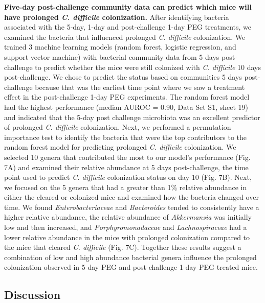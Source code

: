 \documentclass[
  11pt,
]{article}
\begin{document}
\textbf{Five-day post-challenge community data can predict which mice
will have prolonged \emph{C. difficile} colonization.} After identifying
bacteria associated with the 5-day, 1-day and post-challenge 1-day PEG
treatments, we examined the bacteria that influenced prolonged \emph{C.
difficile} colonization. We trained 3 machine learning models (random
forest, logistic regression, and support vector machine) with bacterial
community data from 5 days post-challenge to predict whether the mice
were still colonized with \emph{C. difficile} 10 days post-challenge. We
chose to predict the status based on communities 5 days post-challenge
because that was the earliest time point where we saw a treatment effect
in the post-challenge 1-day PEG experiments. The random forest model had
the highest performance (median AUROC = 0.90, Data Set S1, sheet 19) and
indicated that the 5-day post challenge microbiota was an excellent
predictor of prolonged \emph{C. difficile} colonization. Next, we
performed a permutation importance test to identify the bacteria that
were the top contributors to the random forest model for predicting
prolonged \emph{C. difficile }colonization. We selected 10 genera that
contributed the most to our model's performance (Fig. 7A) and examined
their relative abundance at 5 days post-challenge, the time point used
to predict \emph{C. difficile} colonization status on day 10 (Fig. 7B).
Next, we focused on the 5 genera that had a greater than 1\% relative
abundance in either the cleared or colonized mice and examined how the
bacteria changed over time. We found \emph{Enterobacteriaceae} and
\emph{Bacteroides} tended to consistently have a higher relative
abundance, the relative abundance of \emph{Akkermansia} was initially
low and then increased, and \emph{Porphyromonadaceae} and
\emph{Lachnospiraceae} had a lower relative abundance in the mice with
prolonged colonization compared to the mice that cleared \emph{C.
difficile} (Fig. 7C). Together these results suggest a combination of
low and high abundance bacterial genera influence the prolonged
colonization observed in 5-day PEG and post-challenge 1-day PEG treated
mice.

\hypertarget{discussion}{%
\subsection{Discussion}\label{discussion}}
\end{document}
